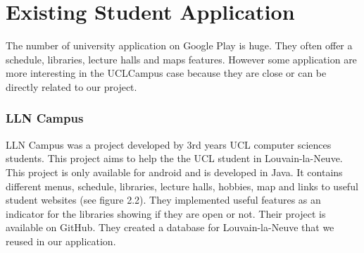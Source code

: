\documentclass{eplmastersthesis}
\begin{document}
\section{Existing Student Application}

The number of university application on Google Play is huge. They often offer a schedule, libraries, lecture halls and maps features. However some application are more interesting in the UCLCampus case because they are close or can be directly related to our project.  

\subsubsection{LLN Campus}
LLN Campus was a project developed by 3rd years UCL computer sciences students. This project aims to help the the UCL student in Louvain-la-Neuve. This project is only available for android and is developed in Java. It contains different menus, schedule, libraries, lecture halls, hobbies, map and links to useful student websites (see figure 2.2). They implemented useful features as an indicator for the libraries showing if they are open or not. Their project is available on GitHub. They created a database for Louvain-la-Neuve that we reused in our application. 
\end{document}

